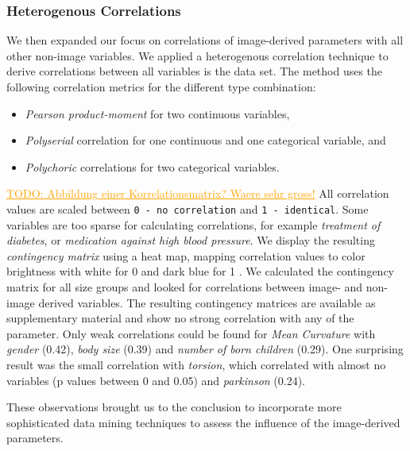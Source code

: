 \documentclass[a4paper,twoside]{style/article}
\newcommand{\com}[1]{\textcolor{orange}{\uline{#1}}}
\begin{document}
\subsubsection{Heterogenous Correlations}
We then expanded our focus on correlations of image-derived parameters with all other non-image variables.
We applied a heterogenous correlation technique to derive correlations between all variables is the data set.
The method uses the following correlation metrics for the different type combination:
\begin{itemize}
\item \emph{Pearson product-moment} for two continuous variables, 
\item \emph{Polyserial} correlation for one continuous and one categorical variable, and
\item \emph{Polychoric} correlations for two categorical variables.
\end{itemize}
\com{TODO: Abbildung einer Korrelationsmatrix? Waere sehr gross!}
All correlation values are scaled between \texttt{0 - no correlation} and \texttt{1 - identical}.
Some variables are too sparse for calculating correlations, for example \emph{treatment of diabetes}, or \emph{medication against high blood pressure}.
We display the resulting \emph{contingency matrix} using a heat map, mapping correlation values to color brightness with white for 0 and dark blue for 1 \cite{Klemm2014VIS}.
We calculated the contingency matrix for all size groups and looked for correlations between image- and non-image derived variables.
The resulting contingency matrices are available as supplementary material and show no strong correlation with any of the parameter.
Only weak correlations could be found for \emph{Mean Curvature} with \emph{gender} (0.42), \emph{body size} (0.39) and \emph{number of born children} (0.29).
One surprising result was the small correlation with \emph{torsion}, which correlated with almost no variables (p values between 0 and 0.05) and \emph{parkinson} (0.24).

These observations brought us to the conclusion to incorporate more sophisticated data mining techniques to assess the influence of the image-derived parameters.
\end{document}
